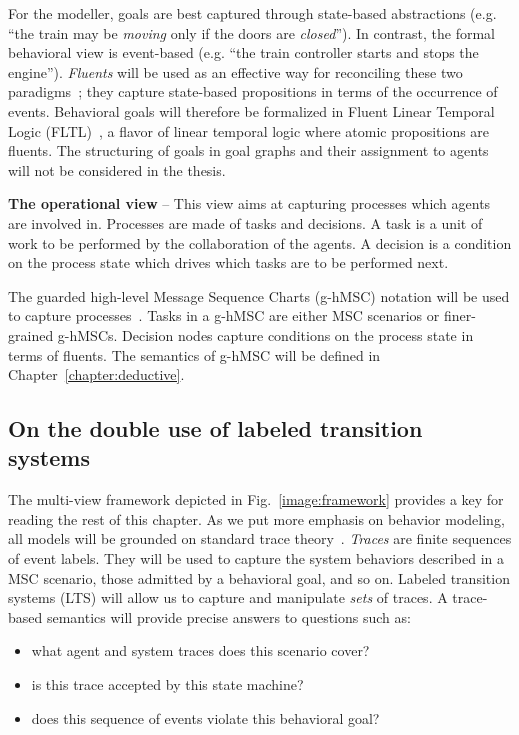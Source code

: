 For the modeller, goals are best captured through state-based abstractions (e.g. ``the train may be \emph{moving} only if the doors are \emph{closed}''). In contrast, the formal behavioral view is event-based (e.g. ``the train controller starts and stops the engine''). \emph{Fluents} will be used as an effective way for reconciling these two paradigms~\cite{Miller:2002}; they capture state-based propositions in terms of the occurrence of events. Behavioral goals will therefore be formalized in Fluent Linear Temporal Logic (FLTL)~\cite{Giannakopoulou:2003}, a flavor of linear temporal logic where atomic propositions are fluents. The structuring of goals in goal graphs and their assignment to agents will not be considered in the thesis.


\noindent \textbf{The operational view} -- This view aims at capturing processes which agents are involved in. Processes are made of tasks and decisions. A task is a unit of work to be performed by the collaboration of the agents. A decision is a condition on the process state which drives which tasks are to be performed next.

The guarded high-level Message Sequence Charts (g-hMSC) notation will be used to capture processes~\cite{Damas:2009, Damas:2011}. Tasks in a g-hMSC are either MSC scenarios or finer-grained g-hMSCs. Decision nodes capture conditions on the process state in terms of fluents. The semantics of g-hMSC will be defined in Chapter~\ref{chapter:deductive}.


\subsection{On the double use of labeled transition systems}

The multi-view framework depicted in Fig.~\ref{image:framework} provides a key for reading the rest of this chapter. As we put more emphasis on behavior modeling, all models will be grounded on standard trace theory~\cite{Hoare:1985}. \emph{Traces} are finite sequences of event labels. They will be used to capture the system behaviors described in a MSC scenario, those admitted by a behavioral goal, and so on. Labeled transition systems (LTS) will allow us to capture and manipulate \emph{sets} of traces. A trace-based semantics will provide precise answers to questions such as:

\begin{itemize} 
\item what agent and system traces does this scenario cover?
\item is this trace accepted by this state machine?
\item does this sequence of events violate this behavioral goal?
\end{itemize}

